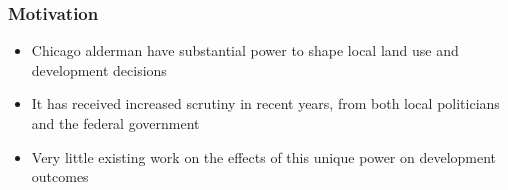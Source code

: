 \begin{frame}
	\frametitle{Motivation}
	\begin{itemize}
		\item Chicago alderman have substantial power to shape local land use and development decisions
		\item It has received increased scrutiny in recent years, from both local politicians and the federal government \\ 
		{\scriptsize \cite{chase_chicago_2023,freemark_zoning_2024}}
		\item Very little existing work on the effects of this unique power on development outcomes \\
		{\scriptsize \cite{khan_decentralized_2021}}
	\end{itemize}
\end{frame}


